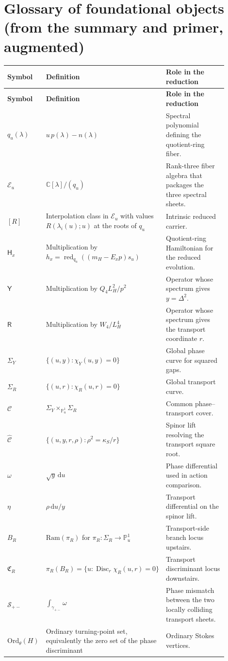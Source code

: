 \documentclass[11pt]{article}
\newcommand{\C}{\mathbb C}
\newcommand{\PP}{\mathbb P}
\newcommand{\dd}{\mathrm{d}}
\newcommand{\Disc}{\operatorname{Disc}}
\newcommand{\CY}{\Sigma_Y}
\newcommand{\CR}{\Sigma_R}
\newcommand{\Chat}{\widehat{\mathcal C}}
\newcommand{\Cu}{\mathcal C}
\newcommand{\Eu}{\mathcal E}
\newcommand{\Hx}{\mathsf H_x}
\newcommand{\Yop}{\mathsf Y}
\newcommand{\Rop}{\mathsf R}
\newcommand{\CRam}{\mathfrak C_R}
\newcommand{\Ord}{\mathrm{Ord}_{\theta}(H)}
\begin{document}
\section{Glossary of foundational objects (from the summary and primer, augmented)}

\small
\begin{longtable}{P{0.17\linewidth}P{0.27\linewidth}P{0.46\linewidth}}
\toprule
\textbf{Symbol} & \textbf{Definition} & \textbf{Role in the reduction}\\
\midrule
\endfirsthead
\toprule
\textbf{Symbol} & \textbf{Definition} & \textbf{Role in the reduction}\\
\midrule
\endhead
$q_u(\lambda)$ & $u\,p(\lambda)-n(\lambda)$ & Spectral polynomial defining the quotient-ring fiber.\\
$\Eu_u$ & $\C[\lambda]/(q_u)$ & Rank-three fiber algebra that packages the three spectral sheets.\\
$[R]$ & Interpolation class in $\Eu_u$ with values $R(\lambda_i(u);u)$ at the roots of $q_u$ & Intrinsic reduced carrier.\\
$\Hx$ & Multiplication by $h_x=\operatorname{red}_{q_u}((m_H-E_xp)s_u)$ & Quotient-ring Hamiltonian for the reduced evolution.\\
$\Yop$ & Multiplication by $Q_4L_H^2/p^2$ & Operator whose spectrum gives $y=\Delta^2$.\\
$\Rop$ & Multiplication by $W_4/L_H^4$ & Operator whose spectrum gives the transport coordinate $r$.\\
$\CY$ & $\{(u,y):\chi_Y(u,y)=0\}$ & Global phase curve for squared gaps.\\
$\CR$ & $\{(u,r):\chi_R(u,r)=0\}$ & Global transport curve.\\
$\Cu$ & $\CY\times_{\PP^1_u}\CR$ & Common phase--transport cover.\\
$\Chat$ & $\{(u,y,r,\rho):\rho^2=\kappa_S/r\}$ & Spinor lift resolving the transport square root.\\
$\omega$ & $\sqrt{y}\,\dd u$ & Phase differential used in action comparison.\\
$\eta$ & $\rho\,\dd u/y$ & Transport differential on the spinor lift.\\
$B_R$ & $\mathrm{Ram}(\pi_R)$ for $\pi_R:\CR\to\PP^1_u$ & Transport-side branch locus upstairs.\\
$\CRam$ & $\pi_R(B_R)=\{u:\Disc_r\chi_R(u,r)=0\}$ & Transport discriminant locus downstairs.\\
$\mathcal S_{+-}$ & $\int_{\gamma_{+-}}\omega$ & Phase mismatch between the two locally colliding transport sheets.\\
$\Ord$ & Ordinary turning-point set, equivalently the zero set of the phase discriminant & Ordinary Stokes vertices.\\
\bottomrule
\end{longtable}
\normalsize
\end{document}
